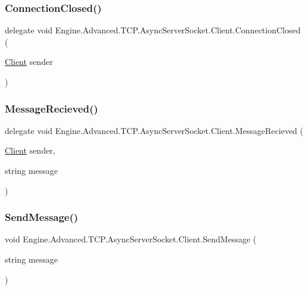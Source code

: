 \subsubsection{\texorpdfstring{ConnectionClosed()}{ConnectionClosed()}}
{\footnotesize\ttfamily delegate void Engine.\+Advanced.\+T\+C\+P.\+Async\+Server\+Socket.\+Client.\+Connection\+Closed (\begin{DoxyParamCaption}\item[{\mbox{\hyperlink{class_engine_1_1_advanced_1_1_t_c_p_1_1_async_server_socket_1_1_client}{Client}}}]{sender }\end{DoxyParamCaption})}

\mbox{\label{class_engine_1_1_advanced_1_1_t_c_p_1_1_async_server_socket_1_1_client_aec5803c220dbc6dbe3cabc218dcfde50}} 
\subsubsection{\texorpdfstring{MessageRecieved()}{MessageRecieved()}}
{\footnotesize\ttfamily delegate void Engine.\+Advanced.\+T\+C\+P.\+Async\+Server\+Socket.\+Client.\+Message\+Recieved (\begin{DoxyParamCaption}\item[{\mbox{\hyperlink{class_engine_1_1_advanced_1_1_t_c_p_1_1_async_server_socket_1_1_client}{Client}}}]{sender,  }\item[{string}]{message }\end{DoxyParamCaption})}

\mbox{\label{class_engine_1_1_advanced_1_1_t_c_p_1_1_async_server_socket_1_1_client_abe931ff844822962811b598617554816}} 
\subsubsection{\texorpdfstring{SendMessage()}{SendMessage()}}
{\footnotesize\ttfamily void Engine.\+Advanced.\+T\+C\+P.\+Async\+Server\+Socket.\+Client.\+Send\+Message (\begin{DoxyParamCaption}\item[{string}]{message }\end{DoxyParamCaption})}

